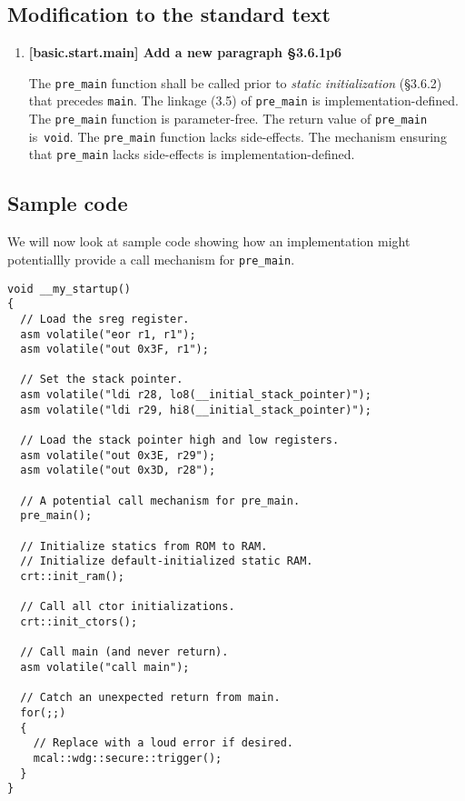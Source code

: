 \documentclass[11pt]{article}
\begin{document}
\subsection*{Modification to the standard text}
\begin{enumerate}

  \item \textbf{[basic.start.main] Add a new paragraph \S3.6.1p6}

  The \lstinline{pre_main} function shall be called prior to
  \emph{static} \emph{initialization} (\S3.6.2)
  that precedes \lstinline{main}.
  The linkage (3.5) of \lstinline{pre_main} is implementation-defined.
  The \lstinline{pre_main} function is parameter-free.
  The return value of \lstinline{pre_main} is~\lstinline{void}.
  The \lstinline{pre_main} function lacks side-effects.
  The mechanism ensuring that \lstinline{pre_main} lacks
  side-effects is implementation-defined.

\end{enumerate}

\subsection*{Sample code}

We will now look at sample code showing how an implementation
might potentiallly provide a call mechanism for \lstinline{pre_main}.
  
\begin{lstlisting}
void __my_startup()
{
  // Load the sreg register.
  asm volatile("eor r1, r1");
  asm volatile("out 0x3F, r1");

  // Set the stack pointer.
  asm volatile("ldi r28, lo8(__initial_stack_pointer)");
  asm volatile("ldi r29, hi8(__initial_stack_pointer)");

  // Load the stack pointer high and low registers.
  asm volatile("out 0x3E, r29");
  asm volatile("out 0x3D, r28");

  // A potential call mechanism for pre_main.
  pre_main();

  // Initialize statics from ROM to RAM.
  // Initialize default-initialized static RAM.
  crt::init_ram();

  // Call all ctor initializations.
  crt::init_ctors();

  // Call main (and never return).
  asm volatile("call main");

  // Catch an unexpected return from main.
  for(;;)
  {
    // Replace with a loud error if desired.
    mcal::wdg::secure::trigger();
  }
}
\end{lstlisting}
  
\end{document}
